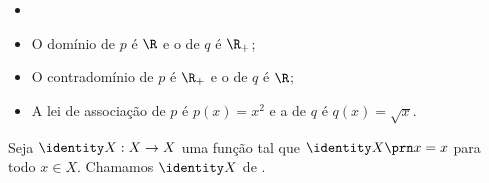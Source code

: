 \begin{solution}
\begin{itemize}
	\item[]
	\vspace{3mm}
	\item O domínio de $p$ é $\R$ e o de $q$ é $\R_+$;
	\item O contradomínio de $p$ é $\R_+$ e o de $q$ é $\R$;
	\item A lei de associação de $p$ é $p(x)=x^2$ e a de $q$ é $q(x)=\sqrt x$.
\end{itemize}
\end{solution}

\begin{definition}
Seja $\identity X : X \to X $ uma função tal que $\identity X \prn x = x$ para todo $x \in X$. Chamamos $\identity X$ de .
\end{definition}